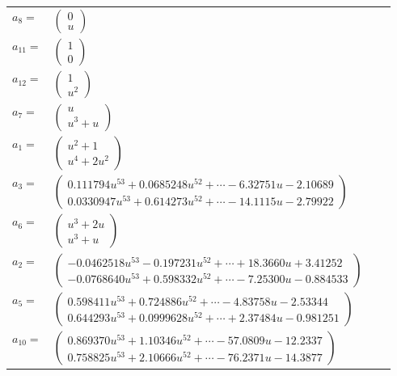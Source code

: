 \documentclass[1p]{elsarticle_modified}
\theoremstyle{definition}
\begin{document}
\begin{tabular}{m{7pt} m{180pt} m{7pt} m{180pt} }
\flushright $a_{8}=$&$\begin{pmatrix}0\\u\end{pmatrix}$ \\
\flushright $a_{11}=$&$\begin{pmatrix}1\\0\end{pmatrix}$ \\
\flushright $a_{12}=$&$\begin{pmatrix}1\\u^2\end{pmatrix}$ \\
\flushright $a_{7}=$&$\begin{pmatrix}u\\u^3+u\end{pmatrix}$ \\
\flushright $a_{1}=$&$\begin{pmatrix}u^2+1\\u^4+2 u^2\end{pmatrix}$ \\
\flushright $a_{3}=$&$\begin{pmatrix}0.111794 u^{53}+0.0685248 u^{52}+\cdots-6.32751 u-2.10689\\0.0330947 u^{53}+0.614273 u^{52}+\cdots-14.1115 u-2.79922\end{pmatrix}$ \\
\flushright $a_{6}=$&$\begin{pmatrix}u^3+2 u\\u^3+u\end{pmatrix}$ \\
\flushright $a_{2}=$&$\begin{pmatrix}-0.0462518 u^{53}-0.197231 u^{52}+\cdots+18.3660 u+3.41252\\-0.0768640 u^{53}+0.598332 u^{52}+\cdots-7.25300 u-0.884533\end{pmatrix}$ \\
\flushright $a_{5}=$&$\begin{pmatrix}0.598411 u^{53}+0.724886 u^{52}+\cdots-4.83758 u-2.53344\\0.644293 u^{53}+0.0999628 u^{52}+\cdots+2.37484 u-0.981251\end{pmatrix}$ \\
\flushright $a_{10}=$&$\begin{pmatrix}0.869370 u^{53}+1.10346 u^{52}+\cdots-57.0809 u-12.2337\\0.758825 u^{53}+2.10666 u^{52}+\cdots-76.2371 u-14.3877\end{pmatrix}$ \\

\end{tabular}
\end{document}

